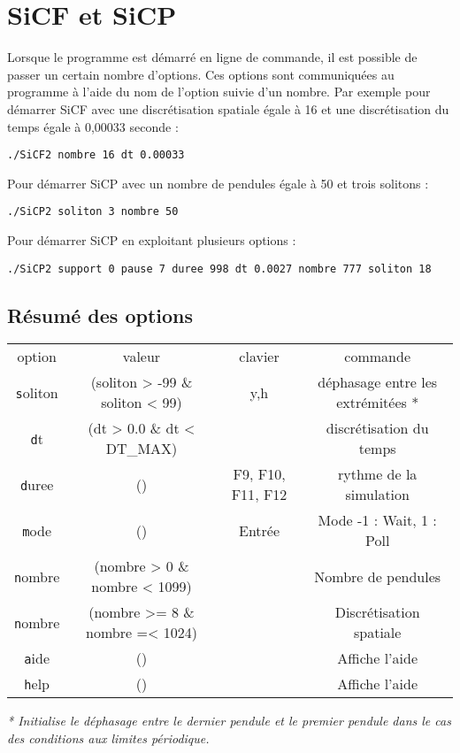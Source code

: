 %
\section{SiCF et SiCP}
%
%
Lorsque le programme est démarré en ligne de commande, il est possible de passer un certain nombre d'options. Ces options sont communiquées au programme à l'aide du nom de l'option suivie d'un nombre. Par exemple pour démarrer SiCF avec une discrétisation spatiale égale à 16 et une discrétisation du temps égale à 0,00033 seconde :
\begin{center}
\texttt{./SiCF2 nombre 16 dt 0.00033}
\end{center}
Pour démarrer SiCP avec un nombre de pendules égale à 50 et trois solitons :
\begin{center}
\texttt{./SiCP2 soliton 3 nombre 50}
\end{center}
%
Pour démarrer SiCP en exploitant plusieurs options :
\begin{center}
\texttt{./SiCP2 support 0 pause 7 duree 998 dt 0.0027 nombre 777 soliton 18}
\end{center}
%
\subsection{Résumé des options}
\begin{center}
\begin{tabular}{cccc}
option & valeur & clavier & commande \\
{\texttt soliton} & (soliton > -99 \& soliton < 99) & {\sf y},{\sf h} & déphasage entre les extrémitées *\\
{\texttt dt} & (dt > 0.0 \& dt < DT\_MAX) &  & discrétisation du temps \\
{\texttt duree} & () & {\sf F9}, {\sf F10}, {\sf F11}, {\sf F12} & rythme de la simulation \\
{\texttt mode} & () & {\sf Entrée} & Mode -1 : Wait, 1 : Poll \\
{\texttt nombre} & (nombre > 0 \& nombre < 1099) &  & Nombre de pendules\\
{\texttt nombre} & (nombre >= 8 \& nombre =< 1024) &  & Discrétisation spatiale\\
{\texttt aide} & () &  & Affiche l'aide \\
{\texttt help} & () &  & Affiche l'aide \\
\end{tabular}
\end{center}

{\it
* Initialise le déphasage entre le dernier pendule et le premier pendule dans le cas des conditions aux limites périodique.

}
%
